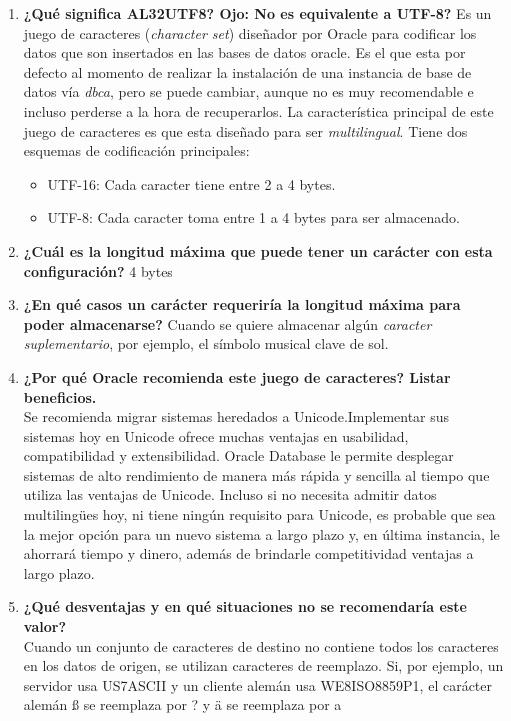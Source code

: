 \documentclass{article}
\begin{document}
\begin{enumerate}[label=\textbf{\Alph*.}]
    \item \textbf{¿Qué significa AL32UTF8? Ojo: No es equivalente a UTF-8?} 
    Es un juego de caracteres (\textit{character set}) diseñador por Oracle
    para codificar los datos que son insertados en las bases de datos oracle. 
    Es el que esta por defecto al momento de realizar la instalación de una
    instancia de base de datos vía \textit{dbca}, pero se puede cambiar, aunque
    no es muy recomendable e incluso perderse a la hora de recuperarlos. 
    La característica principal de este juego de caracteres es que esta diseñado 
    para ser \textit{multilingual}. Tiene dos esquemas de codificación 
    principales: 
    \begin{itemize}
        \item UTF-16: Cada caracter tiene entre 2 a 4 bytes.
        \item UTF-8: Cada caracter toma entre 1 a 4 bytes para ser almacenado.
    \end{itemize}
    \item \textbf{¿Cuál es la longitud máxima que puede tener un carácter con 
    esta configuración?} 4 bytes
    \item \textbf{¿En qué casos un carácter requeriría la longitud máxima para 
    poder almacenarse?} Cuando se quiere almacenar algún \textit{caracter 
    suplementario}, por ejemplo, el símbolo musical clave de sol.
    \item \textbf{¿Por qué Oracle recomienda este juego de caracteres? 
    Listar beneficios.}\\ 
    Se recomienda migrar sistemas heredados a Unicode.Implementar sus
    sistemas hoy en Unicode ofrece muchas ventajas en usabilidad,
    compatibilidad y extensibilidad. Oracle Database le permite desplegar
    sistemas de alto rendimiento de manera más rápida y sencilla al tiempo
    que utiliza las ventajas de Unicode. Incluso si no necesita admitir datos
    multilingües hoy, ni tiene ningún requisito para Unicode, es probable que
    sea la mejor opción para un nuevo sistema a largo plazo y, en última
    instancia, le ahorrará tiempo y dinero, además de brindarle
    competitividad ventajas a largo plazo.
    \item \textbf{¿Qué desventajas y en qué situaciones no se recomendaría 
    este valor?}\\ 
    Cuando un conjunto de caracteres de destino no contiene todos los
    caracteres en los datos de origen, se utilizan caracteres de
    reemplazo. Si, por ejemplo, un servidor usa US7ASCII y un cliente
    alemán usa WE8ISO8859P1, el carácter alemán ß se reemplaza
    por ? y ä se reemplaza por a
\end{enumerate}
\end{document}
